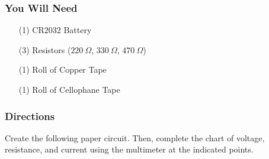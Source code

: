     \subsubsection*{You Will Need}
    \begin{itemize}[noitemsep]
        \item[(1)] CR2032 Battery
        \item[(3)] Resistors ($220\ \Omega$, $330\ \Omega$, $470\ \Omega$)
        \item[(1)] Roll of Copper Tape
        \item[(1)] Roll of Cellophane Tape   
    \end{itemize}
    
    \subsubsection*{Directions}
    Create the following paper circuit. Then, complete the chart of voltage, resistance, and current using the multimeter at the indicated points.

